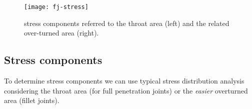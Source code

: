 	\begin{SCfigure}[1][bht]
		\centering \texttt{[image: fj-stress]}
		\caption{stress components referred to the throat area (left) and the related over-turned area (right).} \label{fig:fjstresses}
	\end{SCfigure}
	
\subsection*{Stress components}
	To determine stress components we can use typical stress distribution analysis considering the throat area (for full penetration joints) or the \textit{easier} overturned area (fillet joints).